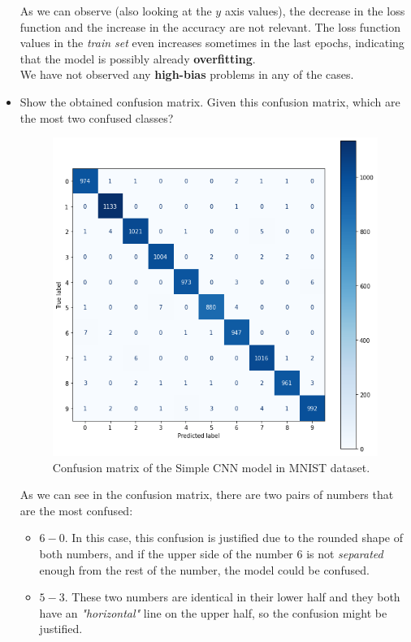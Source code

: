 \documentclass[a4paper]{article}
\begin{document}
\begin{itemize}
        As we can observe (also looking at the \(y\) axis values), the decrease in the loss function and the increase in the accuracy are not relevant. The loss function values in the \emph{train set} even increases sometimes in the last epochs, indicating that the model is possibly already \textbf{overfitting}.\\

        We have not observed any \textbf{high-bias} problems in any of the cases.

  \item Show the obtained confusion matrix. Given this confusion matrix, which are the most two confused classes?


        \begin{figure}[H]
          \centering
          \includegraphics[scale = 0.5]{Figures/SimpleCNNConfusion.png}
          \caption{Confusion matrix of the Simple CNN model in MNIST dataset.}
        \end{figure}

        As we can see in the confusion matrix, there are two pairs of numbers that are the most confused:

        \begin{itemize}
          \item \(6-0\). In this case, this confusion is justified due to the rounded shape of both numbers, and if the upper side of the number \(6\) is not \emph{separated} enough from the rest of the number, the model could be confused.
          \item \(5-3\). These two numbers are identical in their lower half and they both have an \emph{"horizontal"} line on the upper half, so the confusion might be justified.
        \end{itemize}


\end{itemize}
\end{document}
